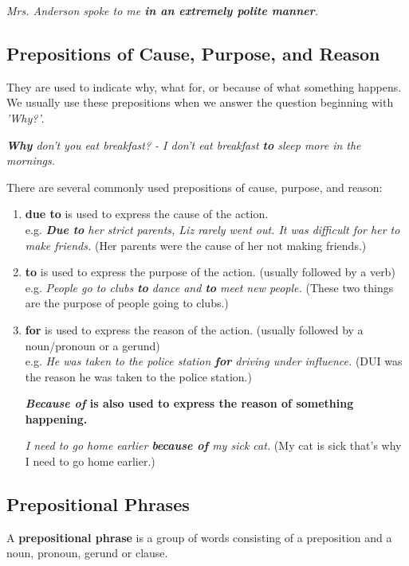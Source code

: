 \documentclass[hidelinks,10pt,a4paper]{article}
\begin{document}
\begin{center}
	\textit{Mrs. Anderson spoke to me \textbf{in an extremely polite manner}.}
\end{center}

\subsection{Prepositions of Cause, Purpose, and Reason}
They are used to indicate why, what for, or because of what something happens. We usually use these prepositions when we answer the question beginning with \textit{'Why?'}.

\begin{center}
	\textit{\textbf{Why} don't you eat breakfast? - I don't eat breakfast \textbf{to} sleep more in the mornings.}
\end{center}

There are several commonly used prepositions of cause, purpose, and reason:
\begin{enumerate}[label=(\alph*)]
	\item \textbf{due to} is used to express the cause of the action.\\
		e.g. \textit{\textbf{Due to} her strict parents, Liz rarely went out. It was difficult for her to make friends.} (Her parents were the cause of her not making friends.)
	\item \textbf{to}  is used to express the purpose of the action. (usually followed by a verb) \\
		e.g. \textit{People go to clubs \textbf{to} dance and \textbf{to} meet new people.} (These two things are the purpose of people going to clubs.)
	\item \textbf{for} is used to express the reason of the action. (usually followed by a noun/pronoun or a gerund)\\
		e.g. \textit{He was taken to the police station \textbf{for} driving under influence.} (DUI was the reason he was taken to the police station.)
		\begin{center}
			\textbf{\textit{Because of} is also used to express the reason of something happening. }
		\end{center}
		\textit{I need to go home earlier \textbf{because of} my sick cat.} (My cat is sick that's why I need to go home earlier.)
\end{enumerate}

\subsection{Prepositional Phrases}
A \textbf{prepositional phrase} is a group of words consisting of a preposition and a noun, pronoun, gerund or clause.
\end{document}
